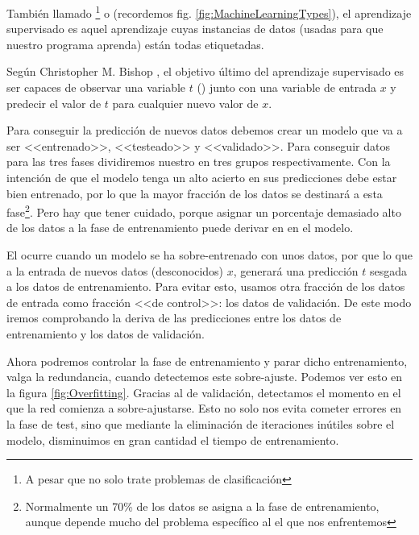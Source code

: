 También llamado \footnote{A pesar que no solo trate problemas de clasificación} o  (recordemos fig. \ref{fig:MachineLearningTypes}), el aprendizaje supervisado es aquel aprendizaje cuyas instancias de datos (usadas para que nuestro programa aprenda) están todas etiquetadas.

Según Christopher M. Bishop \et {}, el objetivo último del aprendizaje supervisado es ser capaces de observar una variable $t$ () junto con una variable de entrada $x$ y predecir el valor de $t$ para cualquier nuevo valor de $x$.

Para conseguir la predicción de nuevos datos debemos crear un modelo que va a ser <<entrenado>>, <<testeado>> y <<validado>>. Para conseguir datos para las tres fases dividiremos nuestro  en tres grupos respectivamente. Con la intención de que el modelo tenga un alto acierto en sus predicciones debe estar bien entrenado, por lo que la mayor fracción de los datos se destinará a esta fase\footnote{Normalmente un 70\% de los datos se asigna a la fase de entrenamiento, aunque depende mucho del problema específico al el que nos enfrentemos}. Pero hay que tener cuidado, porque asignar un porcentaje demasiado alto de los datos a la fase de entrenamiento puede derivar en  en el modelo.

El  ocurre cuando un modelo se ha sobre-entrenado con unos datos, por que lo que a la entrada de nuevos datos (desconocidos) $x$, generará una predicción $t$ sesgada a los datos de entrenamiento. Para evitar esto, usamos otra fracción de los datos de entrada como fracción <<de control>>: los datos de validación. De este modo iremos comprobando la deriva de las predicciones entre los datos de entrenamiento y los datos de validación.

Ahora podremos controlar la fase de entrenamiento y parar dicho entrenamiento, valga la redundancia, cuando detectemos este sobre-ajuste. Podemos ver esto en la figura \ref{fig:Overfitting}.
Gracias al  de validación, detectamos el momento en el que la red comienza a sobre-ajustarse. Esto no solo nos evita cometer errores en la fase de test, sino que mediante la eliminación de iteraciones inútiles sobre el modelo, disminuimos en gran cantidad el tiempo de entrenamiento.


